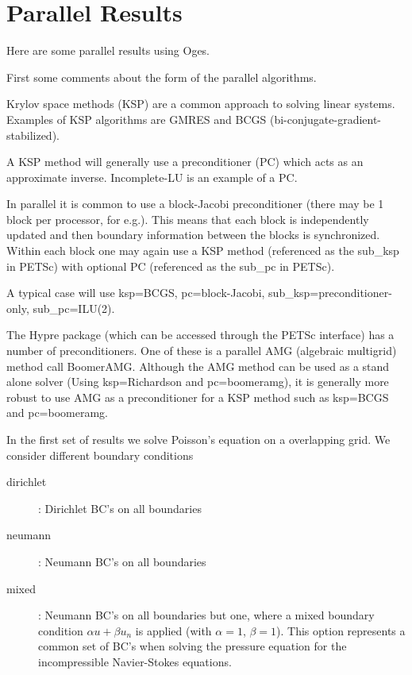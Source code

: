 

\section{Parallel Results} \label{sec:OgesParallelResults}

Here are some parallel results using Oges.

First some comments about the form of the parallel algorithms.

Krylov space methods (KSP) are a common approach to solving linear 
systems. Examples of KSP algorithms are GMRES and BCGS (bi-conjugate-gradient-stabilized). 

A KSP method will generally use a preconditioner (PC) which acts as an approximate inverse.
Incomplete-LU is an example of a PC.

In parallel it is common to use a block-Jacobi preconditioner 
(there may be 1 block per processor, for e.g.). This means that each block
is independently updated and then boundary information between the blocks
is synchronized. Within each block one may again use a KSP method (referenced as
the sub\_ksp in PETSc) with optional PC (referenced as the sub\_pc in PETSc).

A typical case will use ksp=BCGS, pc=block-Jacobi, sub\_ksp=preconditioner-only,
sub\_pc=ILU(2). 


The Hypre package (which can be accessed through the PETSc interface) has
a number of preconditioners. One of these is a parallel AMG (algebraic multigrid)
method call BoomerAMG. Although the AMG method can be used as a stand alone
solver (Using ksp=Richardson and pc=boomeramg), it is generally more robust to use
AMG as a preconditioner for a KSP method such as ksp=BCGS and pc=boomeramg.



%
  

In the first set of results we solve Poisson's equation on a overlapping grid.
We consider different boundary conditions
\begin{description}
  \item[dirichlet] : Dirichlet BC's on all boundaries
  \item[neumann] : Neumann BC's on all boundaries
  \item[mixed] : Neumann BC's on all boundaries but one, where a mixed boundary condition $\alpha u + \beta u_n$
            is applied (with $\alpha=1$, $\beta=1$). This option represents a common set of BC's when solving
            the pressure equation for the incompressible Navier-Stokes equations.
\end{description}

